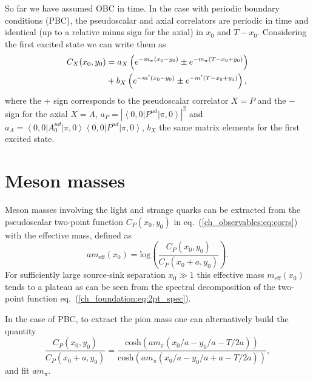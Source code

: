 So far we have assumed OBC in time. In the case with periodic boundary conditions (PBC), the pseudoscalar and axial correlators are periodic in time and identical (up to a relative minus sign for the axial) in $x_0$ and $T-x_0$. Considering the first excited state we can write them as
\begin{align}
\label{ch_observables:eq:corrs_PBC}
C_X(x_0,y_0)&=a_X\left(e^{-m_{\pi}(x_0-y_0)}\pm e^{-m_{\pi}(T-x_0+y_0)}\right) \notag \\
&+b_X\left(e^{-m'(x_0-y_0)}\pm e^{-m'(T-x_0+y_0)}\right),
\end{align}
where the $+$ sign corresponds to the pseudoscalar correlator $X=P$ and the $-$ sign for the axial $X=A$,  $a_P=|\left<0,0\right|P^{ud}\left|\pi,0\right>|^2$ and $a_A=\left<0,0\right|A_0^{ud}\left|\pi,0\right>\left<0,0\right|P^{ud}\left|\pi,0\right>$, $b_X$ the same matrix elements for the first excited state. 


\section{Meson masses}
\label{ch_observables:sec:meson_mass}

Meson masses involving the light and strange quarks can be extracted from the pseudoscalar two-point function $C_P(x_0,y_0)$ in eq.~(\ref{ch_observables:eq:corrs}) with the effective mass, defined as
\begin{equation}
\label{ch_observables:eq:meff}
am_{\textrm{eff}}(x_0)={\textrm{log}}\left(\frac{C_P(x_0,y_0)}{C_P(x_0+a,y_0)}\right).
\end{equation}
For sufficiently large source-sink separation $x_0\gg 1$ this effective mass $m_{\textrm{eff}}(x_0)$ tends to a plateau as can be seen from the spectral decomposition of the two-point function eq.~(\ref{ch_foundation:eq:2pt_spec}).

In the case of PBC, to extract the pion mass one can alternatively build the quantity
\begin{equation}
\label{ch_observables:eq:meff_PBC}
\frac{C_P(x_0,y_0)}{C_P(x_0+a,y_0)}=\frac{{\textrm{cosh}}(am_{\pi}(x_0/a-y_0/a-T/2a))}{{\textrm{cosh}}(am_{\pi}(x_0/a-y_0/a+a-T/2a))},
\end{equation}
and fit $am_{\pi}$.

